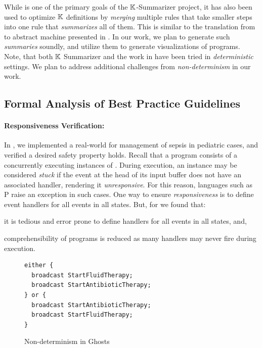 While \SBC{} is one of the primary goals of the $\mathbb{K}{}$-Summarizer
project, it has also been used to optimize $\mathbb{K}$ definitions
by \emph{merging} multiple rules that take smaller steps into
one rule that \emph{summarizes} all of them. This is similar
to the translation from \SOS{} to abstract machine presented in
\cite{KoppelICFP22}. In our work, we plan to generate such
\emph{summaries} soundly, and utilize them to generate visualizations
of \MediK{} programs. Note, that both $\mathbb{K}$ Summarizer and the work
in \cite{KoppelICFP22} have been tried in \emph{deterministic} settings.
We plan to address additional challenges from \emph{non-determinism} in our
work.

\subsection{Formal Analysis of Best Practice Guidelines}\label{subsec:formal-analysis}

\paragraph{Responsiveness Verification:}

In \cite{SaxenaFMCAD23}, we implemented a real-world \CDSS{} for management of
sepsis in pediatric cases, and verified a desired safety property holds.
Recall that a \MediK{} program consists of a concurrently executing instances
of \FSMs{}. During execution, an instance may be considered \emph{stuck} if
the event at the head of its input buffer does not have an associated handler,
rendering it \emph{unresponsive}. For this reason, languages such as P
\cite{DesaiPLDI13} raise an exception in such cases. One way to ensure
\emph{responsiveness} is to define event handlers for all events
in all states. But, for \MediK{} we found that:
\begin{enumerate*}[label=(\alph*)]
  \item it is tedious and error prone to define handlers for all events in all
  states, and,
  \item comprehensibility of programs is reduced as many handlers may never fire
  during execution.
\end{enumerate*}

\begin{figure}
\begin{lstlisting}[style=mediksty
,language=medik
,basicstyle=\ttfamily\scriptsize
,numberstyle=\tiny
,framexleftmargin=1.5em
,xleftmargin=2em
]
either {
  broadcast StartFluidTherapy;
  broadcast StartAntibioticTherapy;
} or {
  broadcast StartAntibioticTherapy;
  broadcast StartFluidTherapy;
}
\end{lstlisting}
  \caption{Non-determinism in \MediK{} Ghosts}\label{fig:non-determinism}
\end{figure}

